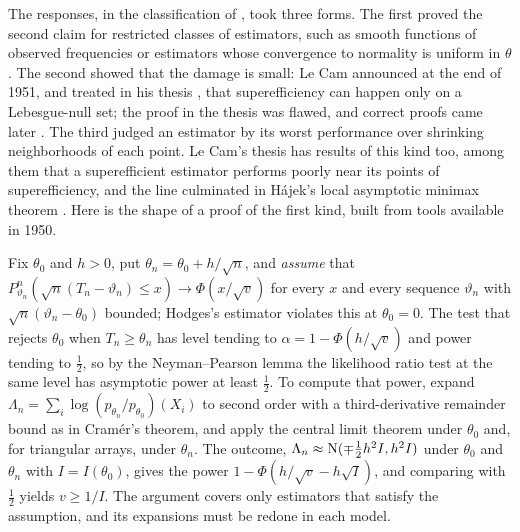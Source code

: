 \begin{refsection}
The responses, in the classification of \textcite{Vovk2009}, took three forms. The first proved the second claim for restricted classes of estimators, such as smooth functions of observed frequencies or estimators whose convergence to normality is uniform in $\theta$. The second showed that the damage is small: Le Cam announced at the end of 1951, and treated in his thesis \parencite{LeCam1953}, that superefficiency can happen only on a Lebesgue-null set; the proof in the thesis was flawed, and correct proofs came later \parencite{Vovk2009,vanderVaart1997}. The third judged an estimator by its worst performance over shrinking neighborhoods of each point. Le Cam's thesis has results of this kind too, among them that a superefficient estimator performs poorly near its points of superefficiency, and the line culminated in Hájek's local asymptotic minimax theorem \parencite{Hajek1972}. Here is the shape of a proof of the first kind, built from tools available in 1950.

\begin{aside}
Fix $\theta_0$ and $h>0$, put $\theta_n=\theta_0+h/\sqrt n$, and \emph{assume} that $P^n_{\vartheta_n}(\sqrt n(T_n-\vartheta_n)\le x)\to\Phi(x/\sqrt v)$ for every $x$ and every sequence $\vartheta_n$ with $\sqrt n(\vartheta_n-\theta_0)$ bounded; Hodges's estimator violates this at $\theta_0=0$. The test that rejects $\theta_0$ when $T_n\ge\theta_n$ has level tending to $\alpha=1-\Phi(h/\sqrt v)$ and power tending to $\tfrac12$, so by the Neyman--Pearson lemma the likelihood ratio test at the same level has asymptotic power at least $\tfrac12$. To compute that power, expand $\Lambda_n=\sum_i\log(p_{\theta_n}/p_{\theta_0})(X_i)$ to second order with a third-derivative remainder bound as in Cramér's theorem, and apply the central limit theorem under $\theta_0$ and, for triangular arrays, under $\theta_n$. The outcome, $\Lambda_n\approx\mathrm{N}(\mp\tfrac12h^2I,h^2I)$ under $\theta_0$ and $\theta_n$ with $I=I(\theta_0)$, gives the power $1-\Phi(h/\sqrt v-h\sqrt I)$, and comparing with $\tfrac12$ yields $v\ge1/I$. The argument covers only estimators that satisfy the assumption, and its expansions must be redone in each model.
\end{aside}


\end{refsection}

